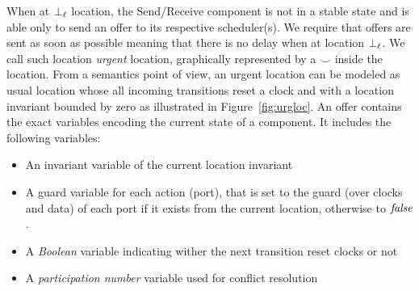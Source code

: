 

When at $\perp_{\ell}$ location, the Send/Receive component is not in a stable state and is able only
to send an offer to its respective scheduler(s). We require that offers are sent as soon as 
possible meaning that there is no delay when at location $\perp_{\ell}$. We call such location
\emph{urgent} location, graphically represented by a $\smile$ inside the location. 
From a semantics point of view, an urgent location can be modeled 
as usual location whose all incoming transitions reset a clock and with a location invariant
bounded by zero as illustrated in Figure~\ref{fig:urgloc}.
An offer contains the exact variables encoding the current state of a component. It includes
the following variables:
\begin{itemize}
  \item An invariant variable of the current location invariant 
  \item A guard variable for each action (port), that is set to the guard (over clocks and data)
    of each port if it exists from the current location, otherwise to $\textnormal{\textit{false}}$.
  \item A \emph{Boolean} variable indicating wither the next transition reset clocks or not 
  \item A \emph{participation number} variable used for conflict resolution
\end{itemize}


